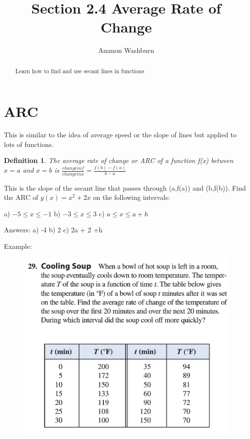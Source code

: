 \documentclass{tufte-handout}
\title{Section 2.4 Average Rate of Change}
\author[AW]{Ammon Washburn}
\newtheorem{mydef}{Definition}
\begin{document}
\maketitle

\begin{abstract}
Learn how to find and use secant lines in functions
\end{abstract}
\section{ARC}
This is similar to the idea of average speed or the slope of lines but applied to lots of functions.

\begin{mydef}
The average rate of change or ARC of a function f(x) between $x=a$ and $x=b$ is $\frac{change in f}{change in x} = \frac{f(b)-f(a)}{b-a}$
\end{mydef}

This is the slope of the secant line that passes through (a,f(a)) and (b,f(b)).  Find the ARC of $y(x) = x^2+2x$ on the following intervals: 

a) $-5 \leq x \leq -1$ \hspace{1 cm} b) $-3 \leq x \leq 3 $ \hspace{1 cm} c) $a \leq x \leq a + h$

Answers: a) -4 \hspace{1 cm} b) 2 \hspace{1 cm} c) 2a + 2 +h

Example:
\begin{figure}
\centering
\includegraphics[width = \linewidth]{2-4CoolingProblem.png}
\end{figure}
\end{document}
